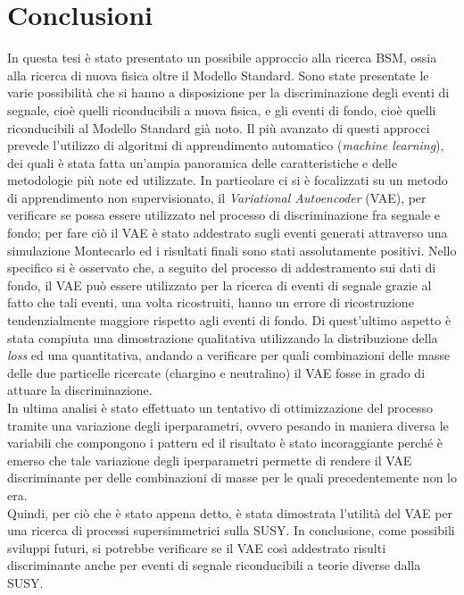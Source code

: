 
\section{Conclusioni}
\label{sec:conclusioni}

In questa tesi è stato presentato un possibile approccio alla ricerca BSM, ossia alla ricerca di nuova fisica oltre il Modello Standard. Sono state presentate le varie possibilità che si hanno a disposizione per la discriminazione degli eventi di segnale, cioè quelli riconducibili a nuova fisica, e gli eventi di fondo, cioè quelli riconducibili al Modello Standard già noto. Il più avanzato di questi approcci prevede l'utilizzo di algoritmi di apprendimento automatico (\textit{machine learning}), dei quali è stata fatta un'ampia panoramica delle caratteristiche e delle metodologie più note ed utilizzate. In particolare ci si è focalizzati su un metodo di apprendimento non supervisionato, il \textit{Variational Autoencoder} (VAE), per verificare se possa essere utilizzato nel processo di discriminazione fra segnale e fondo; per fare ciò il VAE è stato addestrato sugli eventi generati attraverso una simulazione Montecarlo ed i risultati finali sono stati assolutamente positivi. Nello specifico si è osservato che, a seguito del processo di addestramento sui dati di fondo, il VAE può essere utilizzato per la ricerca di eventi di segnale grazie al fatto che tali eventi, una volta ricostruiti, hanno un errore di ricostruzione tendenzialmente maggiore rispetto agli eventi di fondo. Di quest'ultimo aspetto è stata compiuta una dimostrazione qualitativa utilizzando la distribuzione della \textit{loss} ed una quantitativa, andando a verificare per quali combinazioni delle masse delle due particelle ricercate (chargino e neutralino) il VAE fosse in grado di attuare la discriminazione.\\
In ultima analisi è stato effettuato un tentativo di ottimizzazione del processo tramite una variazione degli iperparametri, ovvero pesando in maniera diversa le variabili che compongono i pattern ed il risultato è stato incoraggiante perché è emerso che tale variazione degli iperparametri permette di rendere il VAE discriminante per delle combinazioni di masse per le quali precedentemente non lo era.\\
Quindi, per ciò che è stato appena detto, è stata dimostrata l'utilità del VAE per una ricerca di processi supersimmetrici sulla SUSY. In conclusione, come possibili sviluppi futuri, si potrebbe verificare se il VAE così addestrato risulti discriminante anche per eventi di segnale riconducibili a teorie diverse dalla SUSY.